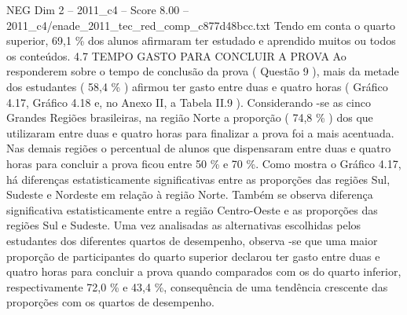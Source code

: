 \begin{textsample}{NEG Dim 2 – 2011\_c4 – Score 8.00 – 2011\_c4/enade\_2011\_tec\_red\_comp\_c877d48bcc.txt}
Tendo em conta o quarto superior, 69,1 \% dos alunos afirmaram ter estudado e aprendido muitos ou todos os conteúdos. 4.7 TEMPO GASTO PARA CONCLUIR A PROVA Ao responderem sobre o tempo de conclusão da prova ( Questão 9 ), mais da metade dos estudantes ( 58,4 \% ) afirmou ter gasto entre duas e quatro horas ( Gráfico 4.17, Gráfico 4.18 e, no Anexo II, a Tabela II.9 ).
Considerando -se as cinco Grandes Regiões brasileiras, na região Norte a proporção ( 74,8 \% ) dos que utilizaram entre duas e quatro horas para finalizar a prova foi a mais acentuada.
Nas demais regiões o percentual de alunos que dispensaram entre duas e quatro horas para concluir a prova ficou entre 50 \% e 70 \%.
Como mostra o Gráfico 4.17, há diferenças estatisticamente significativas entre as proporções das regiões Sul, Sudeste e Nordeste em relação à região Norte.
Também se observa diferença significativa estatisticamente entre a região Centro-Oeste e as proporções das regiões Sul e Sudeste.
Uma vez analisadas as alternativas escolhidas pelos estudantes dos diferentes quartos de desempenho, observa -se que uma maior proporção de participantes do quarto superior declarou ter gasto entre duas e quatro horas para concluir a prova quando comparados com os do quarto inferior, respectivamente 72,0 \% e 43,4 \%, consequência de uma tendência crescente das proporções com os quartos de desempenho.

\end{textsample}
